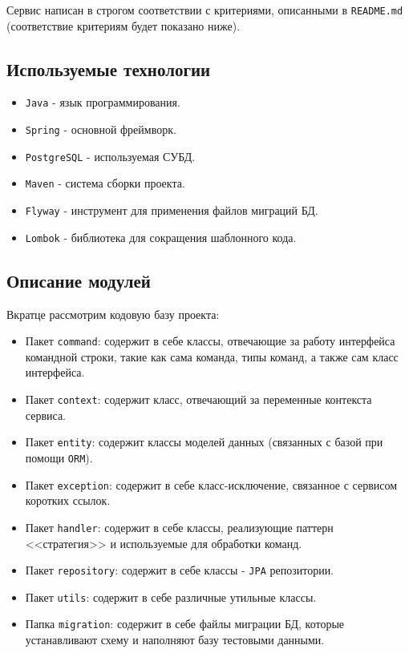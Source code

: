 \documentclass[a4paper, 14pt]{article}
\begin{document}
Сервис написан в строгом соответствии с критериями, описанными в \texttt{README.md} (соответствие критериям будет показано ниже).

\subsection{Используемые технологии}

\begin{itemize}
	\item \texttt{Java} - язык программирования.
	\item \texttt{Spring} - основной фреймворк.
	\item \texttt{PostgreSQL} - используемая СУБД.
	\item \texttt{Maven} - система сборки проекта.
	\item \texttt{Flyway} - инструмент для применения файлов миграций БД.
	\item \texttt{Lombok} - библиотека для сокращения шаблонного кода.
\end{itemize}

\subsection{Описание модулей}

Вкратце рассмотрим кодовую базу проекта:

\begin{itemize}
	\item Пакет \texttt{command}: содержит в себе классы, отвечающие за работу интерфейса командной строки, такие как сама команда, типы команд, а также сам класс интерфейса.
	\item Пакет \texttt{context}: содержит класс, отвечающий за переменные контекста сервиса.
	\item Пакет \texttt{entity}: содержит классы моделей данных (связанных с базой при помощи \texttt{ORM}).
	\item Пакет \texttt{exception}: содержит в себе класс-исключение, связанное с сервисом коротких ссылок.
	\item Пакет \texttt{handler}: содержит в себе классы, реализующие паттерн <<стратегия>> и используемые для обработки команд.
	\item Пакет \texttt{repository}: содержит в себе классы - \texttt{JPA} репозитории.
	\item Пакет \texttt{utils}: содержит в себе различные утильные классы.
	\item Папка \texttt{migration}: содержит в себе файлы миграции БД, которые устанавливают схему и наполняют базу тестовыми данными.
\end{itemize}
\end{document}
